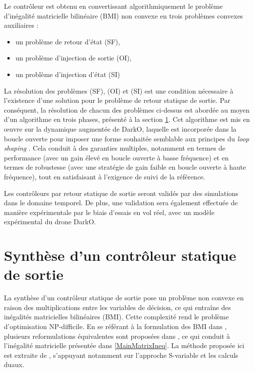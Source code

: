Le contrôleur est obtenu en convertissant algorithmiquement le problème d'inégalité matricielle bilinéaire (BMI) non convexe en trois problèmes convexes auxiliaires :
\begin{itemize}
    \item un problème de retour d'état (SF),
    \item un problème d'injection de sortie (OI),
    \item un problème d'injection d'état (SI)
\end{itemize}



La résolution des problèmes (SF), (OI) et (SI) est une condition nécessaire à l'existence d'une solution pour le problème de retour statique de sortie. Par conséquent, la résolution de chacun des problèmes ci-dessus est abordée au moyen d'un algorithme en trois phases, présenté à la section \ref{SOF Controller Synthesis}. Cet algorithme est mis en œuvre sur la dynamique augmentée de DarkO, laquelle est incorporée dans la boucle ouverte pour imposer une forme souhaitée semblable aux principes du \textit{loop shaping} \cite{McFarlane1992}. Cela conduit à des garanties multiples, notamment en termes de performance (avec un gain élevé en boucle ouverte à basse fréquence) et en termes de robustesse (avec une stratégie de gain faible en boucle ouverte à haute fréquence), tout en satisfaisant à l'exigence de suivi de la référence. 

Les contrôleurs par retour statique de sortie seront validés par des simulations dans le domaine temporel. De plus, une validation sera également effectuée de manière expérimentale par le biais d'essais en vol réel, avec un modèle expérimental du drone DarkO. 


\section{Synthèse d'un contrôleur statique de sortie}
\label{SOF Controller Synthesis}

La synthèse d'un contrôleur statique de sortie pose un problème non convexe en raison des multiplications entre les variables de décision, ce qui entraîne des inégalités matricielles bilinéaires (BMI). Cette complexité rend le problème d'optimisation NP-difficile. 
En se référant à la formulation des BMI dans \cite{ebihara2015}, plusieurs reformulations équivalentes sont proposées dans \cite{Arzelier2018}, ce qui conduit à l'inégalité matricielle présentée dans \eqref{MainMatrixIneq}. La méthode proposée ici est extraite de \cite{ebihara2015}, s'appuyant notamment sur l'approche S-variable et les calculs duaux.



